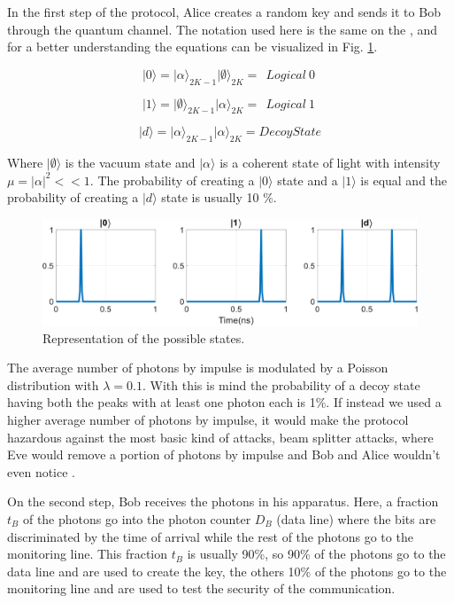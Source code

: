 \begin{refsection}
In the first step of the protocol, Alice creates a random key and sends it to Bob through the quantum channel. The notation used here is the same on the \cite{gisin2004towards}, and for a better understanding the equations can be visualized in Fig. \ref{fig:sta}.

$$|0\rangle = |\alpha\rangle_{2K-1} |\emptyset\rangle_{2K} =\ \ Logical\ 0\ $$

$$|1\rangle = |\emptyset\rangle_{2K-1} |\alpha\rangle_{2K} =\ \ Logical\ 1\ $$

$$|d\rangle = |\alpha\rangle_{2K-1} |\alpha\rangle_{2K} = Decoy State$$

Where $|\emptyset\rangle$ is the vacuum state and $|\alpha\rangle$ is a coherent state of light with intensity $\mu=|\alpha|^2<<1$. The probability of creating a $|0\rangle$ state and a $|1\rangle$ is equal and the probability of creating a $|d\rangle$ state is usually 10 \%.

\begin{figure}[hbt!]
\centering
\includegraphics[width=1\linewidth]{./sdf/tq_76558_cow_protocol/slides/figures/S1.pdf}
\caption{Representation of the possible states.}
\label{fig:sta}
\end{figure}

The average number of photons by impulse is modulated by a Poisson distribution with $\lambda=0.1$. With this is mind the probability of a decoy state having both the peaks with at least one photon each is 1\%. If instead we used a higher average number of photons by impulse, it would make the protocol hazardous against the most basic kind of attacks, beam splitter attacks, where Eve would remove a portion of photons by impulse and Bob and Alice wouldn't even notice \cite{kronberg2017analysis}.

On the second step, Bob receives the photons in his apparatus. Here, a fraction $t_B$ of the photons go into the photon counter $D_B$ (data line) where the bits are discriminated by the time of arrival while the rest of the photons go to the monitoring line. This fraction $t_B$ is usually 90\%, so 90\% of the photons go to the data line and are used to create the key, the others 10\% of the photons go to the monitoring line and are used to test the security of the communication.


\end{refsection}
